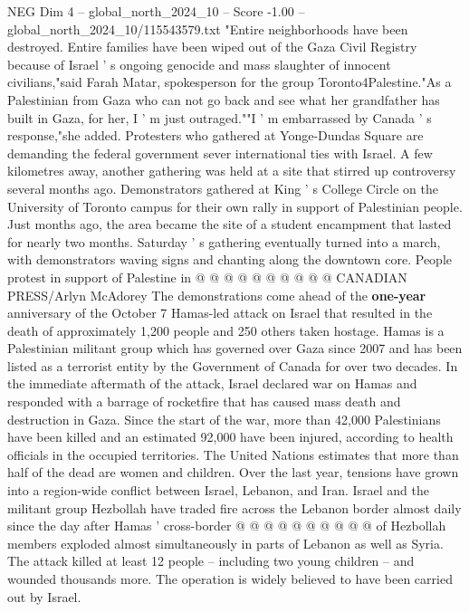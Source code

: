 \begin{textsample}{NEG Dim 4 – global\_north\_2024\_10 – Score -1.00 – global\_north\_2024\_10/115543579.txt}  \label{ex:f4_neg_059}
"Entire neighborhoods have been destroyed.
Entire families have been wiped out of the Gaza Civil Registry because of Israel ' s ongoing genocide and mass slaughter of innocent civilians,"said Farah Matar, spokesperson for the group Toronto4Palestine."As a Palestinian from Gaza who can not go back and see what her grandfather has built in Gaza, for her, I ' m just outraged.""I ' m embarrassed by Canada ' s response,"she added.
Protesters who gathered at Yonge-Dundas Square are demanding the federal government sever international ties with Israel.
A few kilometres away, another gathering was held at a site that stirred up controversy several months ago.
Demonstrators gathered at King ' s College Circle on the University of Toronto campus for their own rally in support of Palestinian people.
Just months ago, the area became the site of a student encampment that lasted for nearly two months.
Saturday ' s gathering eventually turned into a march, with demonstrators waving signs and chanting along the downtown core.
People protest in support of Palestine in @ @ @ @ @ @ @ @ @ @ CANADIAN PRESS/Arlyn McAdorey The demonstrations come ahead of the \textbf{one-year} anniversary of the October 7 Hamas-led attack on Israel that resulted in the death of approximately 1,200 people and 250 others taken hostage.
Hamas is a Palestinian militant group which has governed over Gaza since 2007 and has been listed as a terrorist entity by the Government of Canada for over two decades.
In the immediate aftermath of the attack, Israel declared war on Hamas and responded with a barrage of rocketfire that has caused mass death and destruction in Gaza.
Since the start of the war, more than 42,000 Palestinians have been killed and an estimated 92,000 have been injured, according to health officials in the occupied territories.
The United Nations estimates that more than half of the dead are women and children.
Over the last year, tensions have grown into a region-wide conflict between Israel, Lebanon, and Iran.
Israel and the militant group Hezbollah have traded fire across the Lebanon border almost daily since the day after Hamas ' cross-border @ @ @ @ @ @ @ @ @ @ of Hezbollah members exploded almost simultaneously in parts of Lebanon as well as Syria.
The attack killed at least 12 people -- including two young children -- and wounded thousands more.
The operation is widely believed to have been carried out by Israel.

\end{textsample}
